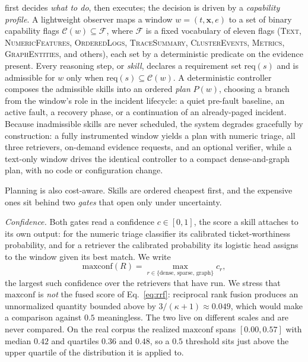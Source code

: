 \sys{} first decides \emph{what to do}, then executes; the decision is driven by a
\emph{capability profile}. A lightweight observer maps a window
$w=(t,\mathbf{x},e)$ to a set of binary capability flags
$\mathcal{C}(w)\subseteq\mathcal{F}$, where $\mathcal{F}$ is a fixed vocabulary of
eleven flags (\textsc{Text}, \textsc{NumericFeatures}, \textsc{OrderedLogs},
\textsc{TraceSummary}, \textsc{ClusterEvents}, \textsc{Metrics},
\textsc{GraphEntities}, and others), each set by a deterministic predicate on the
evidence present. Every reasoning step, or \emph{skill}, declares a requirement
set $\mathrm{req}(s)$ and is admissible for $w$ only when
$\mathrm{req}(s)\subseteq\mathcal{C}(w)$. A deterministic controller composes the
admissible skills into an ordered \emph{plan} $P(w)$, choosing a branch from the
window's role in the incident lifecycle: a quiet pre-fault baseline, an active
fault, a recovery phase, or a continuation of an already-paged incident. Because
inadmissible skills are never scheduled, the system degrades gracefully by
construction: a fully instrumented window yields a plan with numeric triage, all
three retrievers, on-demand evidence requests, and an optional verifier, while a
text-only window drives the identical controller to a compact dense-and-graph plan,
with no code or configuration change.

Planning is also cost-aware. Skills are ordered cheapest first, and the expensive
ones sit behind two \emph{gates} that open only under uncertainty.

\noindent\emph{Confidence.} Both gates read a confidence $c\in[0,1]$, the score a
skill attaches to its own output: for the numeric triage classifier its
calibrated ticket-worthiness probability, and for a retriever the calibrated
probability its logistic head assigns to the window given its best match. We
write
\begin{equation}
\mathrm{maxconf}(R)=\max_{r\in\{\text{dense},\,\text{sparse},\,\text{graph}\}} c_r,
\label{eq:maxconf}
\end{equation}
the largest such confidence over the retrievers that have run. We stress that
$\mathrm{maxconf}$ is \emph{not} the fused score of Eq.~\ref{eq:rrf}: reciprocal
rank fusion produces an unnormalized quantity bounded above by
$3/(\kappa+1)\approx0.049$, which would make a comparison against $0.5$
meaningless. The two live on different scales and are never compared. On the real
corpus the realized $\mathrm{maxconf}$ spans $[0.00,0.57]$ with median $0.42$ and
quartiles $0.36$ and $0.48$, so a $0.5$ threshold sits just above the upper
quartile of the distribution it is applied to.


